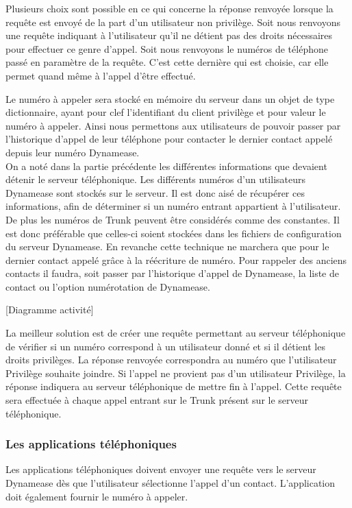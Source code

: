 Plusieurs choix sont possible en ce qui concerne la réponse renvoyée lorsque la requête est envoyé de la part d'un utilisateur non privilège. Soit nous renvoyons une requête indiquant à l'utilisateur qu'il ne détient pas des droits nécessaires pour effectuer ce genre d'appel. Soit nous renvoyons le numéros de téléphone passé en paramètre de la requête. C'est cette dernière qui est choisie, car elle permet quand même à l'appel d'être effectué.

Le numéro à appeler sera stocké en mémoire du serveur dans un objet de type dictionnaire, ayant pour clef l'identifiant du client privilège et pour valeur le numéro à appeler. Ainsi nous permettons aux utilisateurs de pouvoir passer par l'historique d'appel de leur téléphone pour contacter le dernier contact appelé depuis leur numéro Dynamease.\\

On a noté dans la partie précédente les différentes informations que devaient détenir le serveur téléphonique. Les différents numéros d'un utilisateurs Dynamease sont stockés sur le serveur. Il est donc aisé de récupérer ces informations, afin de déterminer si un numéro entrant appartient à l'utilisateur. De plus les numéros de Trunk peuvent être considérés comme des constantes. Il est donc préférable que celles-ci soient stockées dans les fichiers de configuration du serveur Dynamease. En revanche cette technique ne marchera que pour le dernier contact appelé grâce à la réécriture de numéro. Pour rappeler des anciens contacts il faudra, soit passer par l'historique d'appel de Dynamease, la liste de contact ou l'option numérotation de Dynamease.

[Diagramme activité]

La meilleur solution est de créer une requête permettant au serveur téléphonique de vérifier si un numéro correspond à un utilisateur donné et si il détient les droits privilèges. La réponse renvoyée correspondra au numéro que l'utilisateur Privilège souhaite joindre. Si l'appel ne provient pas d'un utilisateur Privilège, la réponse indiquera au serveur téléphonique de mettre fin à l'appel. Cette requête sera effectuée à chaque appel entrant sur le Trunk présent sur le serveur téléphonique.

\subsubsection{Les applications téléphoniques}

Les applications téléphoniques doivent envoyer une requête vers le serveur Dynamease dès que l'utilisateur sélectionne l'appel d'un contact. L'application doit également fournir le numéro à appeler.

